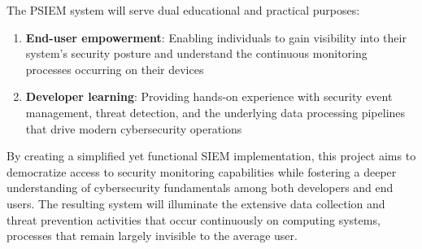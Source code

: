 The PSIEM system will serve dual educational and practical purposes:

\begin{enumerate}
    \item \textbf{End-user empowerment}: Enabling individuals to gain visibility into their system's security posture and understand the continuous monitoring processes occurring on their devices
    \item \textbf{Developer learning}: Providing hands-on experience with security event management, threat detection, and the underlying data processing pipelines that drive modern cybersecurity operations
\end{enumerate}

By creating a simplified yet functional SIEM implementation, this project aims to democratize access to security monitoring capabilities while fostering a deeper understanding of cybersecurity fundamentals among both developers and end users. The resulting system will illuminate the extensive data collection and threat prevention activities that occur continuously on computing systems, processes that remain largely invisible to the average user.
